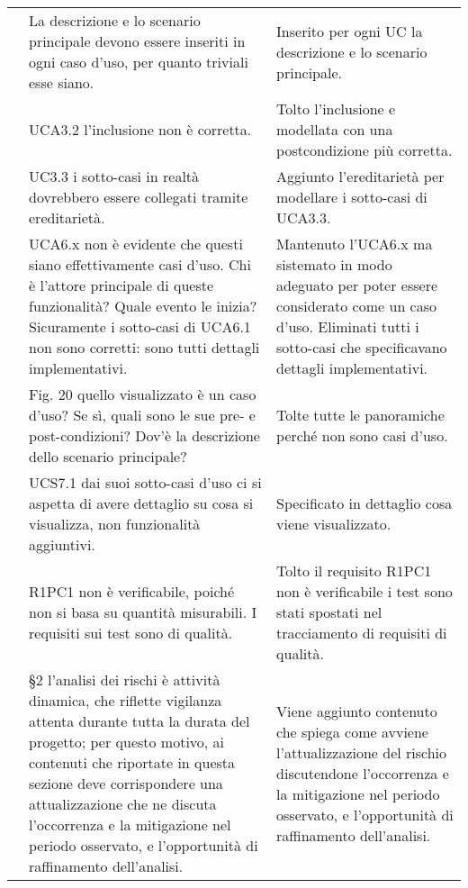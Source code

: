 {\begin{longtable}{ C{2cm} C{6cm} C{6cm}}
		\AdR & La descrizione e lo scenario principale devono essere inseriti in ogni caso d’uso, per quanto triviali esse siano. & Inserito per ogni UC la descrizione e lo scenario principale.\\
		
		\AdR & UCA3.2 l’inclusione non è corretta. & Tolto l'inclusione e modellata con una postcondizione più corretta.\\
		
		\AdR & UC3.3 i sotto-casi in realtà dovrebbero essere collegati tramite ereditarietà. & Aggiunto l'ereditarietà per modellare i sotto-casi di UCA3.3.\\
		
		\AdR & UCA6.x non è evidente che questi siano effettivamente casi d’uso. Chi è
		l’attore principale di queste funzionalità? Quale evento le inizia? Sicuramente
		i sotto-casi di UCA6.1 non sono corretti: sono tutti dettagli implementativi. & Mantenuto l'UCA6.x ma sistemato in modo adeguato per poter essere considerato come un caso d'uso. Eliminati tutti i sotto-casi che specificavano dettagli implementativi.\\
		
		\AdR & Fig. 20 quello visualizzato è un caso d’uso? Se sì, quali sono le sue pre- e	post-condizioni? Dov’è la descrizione dello scenario principale? & Tolte tutte le panoramiche perché non sono casi d'uso.\\
		
		\AdR & UCS7.1 dai suoi sotto-casi d’uso ci si aspetta di avere dettaglio su cosa si visualizza, non funzionalità aggiuntivi. & Specificato in dettaglio cosa viene visualizzato. \\
		
		\AdR &  R1PC1 non è verificabile, poiché non si basa su quantità misurabili. I requisiti sui test sono di qualità. & Tolto il requisito R1PC1 non è verificabile i test sono stati spostati nel tracciamento di requisiti di qualità.\\
		
		\PdP & §2 l’analisi dei rischi è attività dinamica, che riflette vigilanza attenta durante tutta la durata del progetto; per questo motivo, ai contenuti che riportate in questa sezione deve corrispondere una attualizzazione che ne discuta l’occorrenza e la mitigazione nel periodo osservato, e l’opportunità di
		raffinamento dell’analisi. & Viene aggiunto contenuto che spiega come avviene l'attualizzazione del rischio discutendone l’occorrenza e la mitigazione nel periodo osservato, e l’opportunità di raffinamento dell’analisi.\\
		

\end{longtable}}
